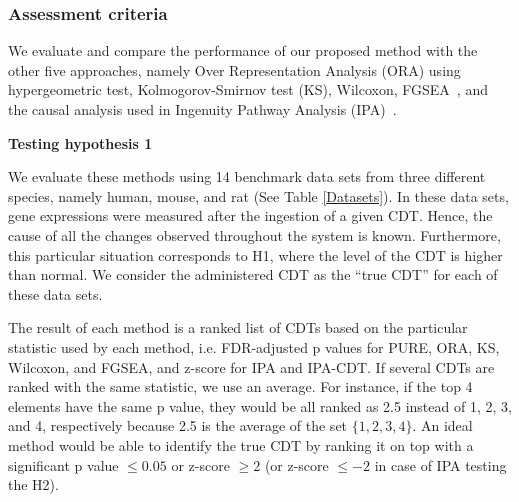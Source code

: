 \documentclass[Minh_PhD_thesis.tex]{subfiles}
\begin{document}
\subsubsection{Assessment criteria}


We evaluate and compare the performance of our proposed method with the other five approaches, namely Over Representation Analysis (ORA) using hypergeometric test, Kolmogorov-Smirnov test (KS)\cite{massey1951kolmogorov}, Wilcoxon\cite{wilcoxon1945individual}, FGSEA~\cite{korotkevich2021fast}, and the causal analysis used in Ingenuity Pathway Analysis (IPA)~\cite{kramer2013causal}.



\textbf{Testing hypothesis 1}

We evaluate these methods using 14 benchmark data sets from three different species, namely human, mouse, and rat (See Table \ref{Datasets}). 
In these data sets, gene expressions were measured after the ingestion of a given CDT.
Hence, the cause of all the changes observed  throughout the system is known. Furthermore, this particular situation corresponds to  H1, where the level of the CDT is higher than normal.
We consider the administered CDT as the ``true CDT'' for each of these data sets.

The result of each method is a ranked list of CDTs based on the particular statistic used by each method, i.e. FDR-adjusted p values for PURE, ORA, KS, Wilcoxon, and FGSEA, and  z-score  for IPA and IPA-CDT. 
If several CDTs are ranked with the same statistic, we use an average. For instance, if  the top 4 elements have the same p value, they would be all ranked as 2.5 instead of 1, 2, 3, and 4, respectively because 2.5 is the average of the set $\{1, 2, 3, 4\}$.
An ideal method would be able to identify the true CDT by ranking it on top with a significant p value $\leq 0.05$ or  z-score $\geq 2$ (or z-score $\leq -2$ in case of IPA testing the H2).
\end{document}
